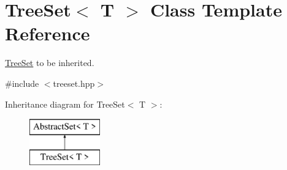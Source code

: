 \hypertarget{class_tree_set}{\section{Tree\-Set$<$ T $>$ Class Template Reference}
\label{class_tree_set}
}


\hyperlink{class_tree_set}{Tree\-Set} to be inherited.  




{\ttfamily \#include $<$treeset.\-hpp$>$}

Inheritance diagram for Tree\-Set$<$ T $>$\-:\begin{figure}[H]
\begin{center}
\leavevmode
\includegraphics[height=2.000000cm]{class_tree_set}
\end{center}
\end{figure}
